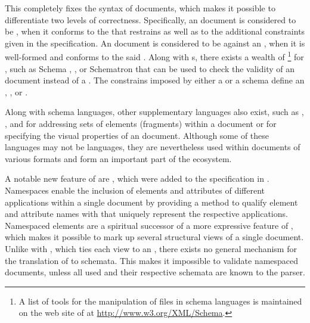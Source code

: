 \documentclass[a5paper,10pt]{book}
\begin{document}
This  completely fixes the syntax of  documents, which
makes it possible to differentiate two levels of correctness. Specifically, an
 document is considered to be %
, when it conforms to the 
 that restrains  as well as to the additional
constraints given in the specification. An  document is
considered to be   against an
 , when it is well-formed and conforms to the said
 .  Along with s, there exists a wealth
of \footnote{
  A list of tools for the manipulation of files in  schema
  languages is maintained on the web site of  at
  \url{http://www.w3.org/XML/Schema}.
} for , such as   Schema%
, , or Schematron that can be used to
check the validity of an  document instead of a .
The constrains imposed by either a  or a schema define an
, , or .
 

Along with schema languages, other supplementary languages also exist, such as
, , and  for addressing sets of elements
(fragments) within a  document or  for specifying the
visual properties of an  document. Although some of these
languages may not be  languages, they are nevertheless used within
documents of various  formats and form an important part of the
ecosystem.

A notable new feature of  are %
, which were added to the specification
\cite{bray99} in \citeyear{bray99}. Namespaces enable the inclusion of elements
and attributes of different  applications within a single
 document by providing a method to qualify element and attribute
names with  that uniquely represent the respective 
applications. Namespaced elements are a spiritual successor of a more
expressive  feature of
, which makes it possible
to mark up several structural views of a single document. Unlike with
, which ties each view to an  ,
there exists no general mechanism for the translation of  to
 schemata. This makes it impossible to validate namespaced
 documents, unless all used  and their respective
schemata are known to the parser.
\end{document}
